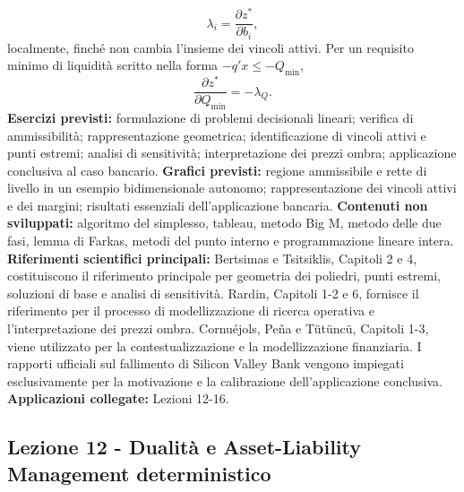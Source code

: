 \documentclass[12pt,a4paper]{article}%
\newcommand{\1}{\mathbf{1}}
\begin{document}
\[
\lambda_i=\frac{\partial z^{*}}{\partial b_i},
\]
localmente, finch\'{e} non cambia l'insieme dei vincoli attivi. Per un
requisito minimo di liquidit\`{a} scritto nella forma
$-q'x\leq-Q_{\min}$,
\[
\frac{\partial z^{*}}{\partial Q_{\min}}=-\lambda_Q.
\]
\textbf{Esercizi previsti:} formulazione di problemi decisionali lineari;
verifica di ammissibilit\`{a}; rappresentazione geometrica; identificazione
di vincoli attivi e punti estremi; analisi di sensitivit\`{a}; interpretazione
dei prezzi ombra; applicazione conclusiva al caso bancario.\newline
\textbf{Grafici previsti:} regione ammissibile e rette di livello in un
esempio bidimensionale autonomo; rappresentazione dei vincoli attivi e dei
margini; risultati essenziali dell'applicazione bancaria.\newline
\textbf{Contenuti non sviluppati:} algoritmo del simplesso, tableau,
metodo Big M, metodo delle due fasi, lemma di Farkas, metodi del punto
interno e programmazione lineare intera.\newline
\textbf{Riferimenti scientifici principali:} Bertsimas e Tsitsiklis,
Capitoli 2 e 4, costituiscono il riferimento principale per geometria dei
poliedri, punti estremi, soluzioni di base e analisi di sensitivit\`{a}.
Rardin, Capitoli 1-2 e 6, fornisce il riferimento per il processo di
modellizzazione di ricerca operativa e l'interpretazione dei prezzi ombra.
Cornu\'{e}jols, Pe\~{n}a e T\"{u}t\"{u}nc\"{u}, Capitoli 1-3, viene
utilizzato per la contestualizzazione e la modellizzazione finanziaria. I
rapporti ufficiali sul fallimento di Silicon Valley Bank vengono impiegati
esclusivamente per la motivazione e la calibrazione dell'applicazione
conclusiva.\newline
\newline
\textbf{Applicazioni collegate:} Lezioni 12-16.

\subsection{Lezione 12 - Dualit\`{a} e Asset-Liability Management
deterministico}
\end{document}
